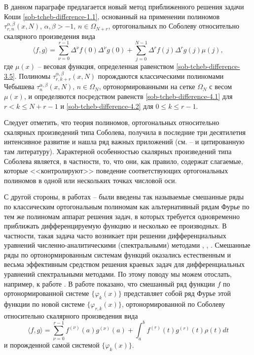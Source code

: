 В данном параграфе предлагается новый метод приближенного решения задачи Коши \eqref{sob-tcheb-difference-1.1}, основанный на применении полиномов $\tau _{r,n}^{\alpha,\beta}(x,N)$, $\alpha,\beta>-1$, $n\in\Omega_{N+r}$, ортогональных по Соболеву относительно скалярного произведения вида
\begin{equation}\label{sob-tcheb-difference-1.4}
\langle f,g \rangle =
\sum_{\nu=0}^{r-1}\Delta^\nu f(0)\Delta^\nu g(0)+
\sum_{j=0}^{N-1}\Delta^rf(j)\Delta^rg(j)\mu(j),
\end{equation}
где $\mu(x)$ -- весовая функция, определенная равенством \eqref{sob-tcheb-difference-3.5}.
Полиномы $\tau _{r,k+r}^{\alpha,\beta}(x,N)$ порождаются классическими полиномами Чебышева $\tau_n^{\alpha,\beta}(x,N)$, $n\in\Omega_N$, ортонормированными на сетке $\Omega_N$  с весом $\mu(x)$, и определяются посредством равенств \eqref{sob-tcheb-difference-4.1} для $r<k \le N+r-1$ и \eqref{sob-tcheb-difference-4.2} для $0 \le k \le r-1$.

Следует отметить, что теория   полиномов, ортогональных относительно скалярных произведений типа Соболева, получила  в последние три десятилетия интенсивное развитие  и нашла ряд важных приложений (см. \cite{sob-tcheb-difference-IserKoch} -- \cite{sob-tcheb-difference-MarcelXu} и цитированную там литературу). Характерной особенностью скалярных  произведений типа Соболева является, в частности, то, что они, как правило,  содержат слагаемые, которые <<контролируют>> поведение соответствующих ортогональных полиномов в одной или нескольких точках числовой оси.

С другой стороны, в работах \cite{sob-tcheb-difference-Shar9} --  \cite{sob-tcheb-difference-SharII} были введены так называемые смешанные ряды по классическим ортогональным полиномам   как альтернативный рядам Фурье по тем же полиномам аппарат решения задач, в которых требуется одновременно приближать дифференцируемую функцию и несколько ее производных. В частности, такая задача часто возникает при решении  дифференциальных уравнений численно-аналитическими (спектральными) методами  \cite{sob-tcheb-difference-SolDmEg}, \cite{sob-tcheb-difference-Tref1},  \cite{sob-tcheb-difference-Tref2}. Смешанные ряды по ортонормированным системам функций оказались естественным и весьма эффективным средством   решения краевых задач для дифференциальных уравнений спектральными методами. По этому поводу мы можем отослать, например, к работе \cite{sob-tcheb-difference-MagKas}. В работе \cite{sob-tcheb-difference-SharII} показано, что смешанный ряд функции $f$ по ортонормированной системе $\{\varphi_k(x)\}$ представляет собой  ряд Фурье этой функции по новой системе $\{\varphi_{r,k}(x)\}$, ортонормированной по Соболеву относительно скалярного произведения вида
\begin{equation}\label{sob-tcheb-difference-1.5}
\langle f,g \rangle=
\sum_{\nu=0}^{r-1}f^{(\nu)}(a)g^{(\nu)}(a)+\int_{a}^{b} f^{(r)}(t)g^{(r)}(t)\rho(t) dt
\end{equation}
и порожденной самой системой $\{\varphi_k(x)\}$.

